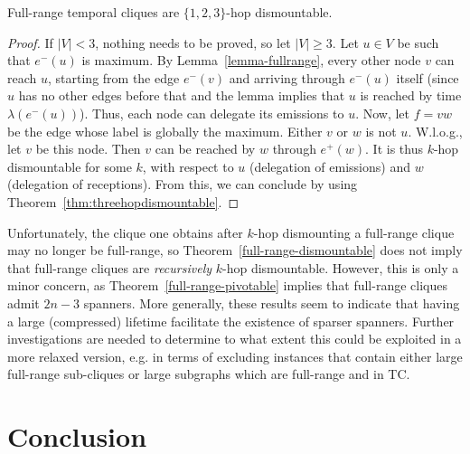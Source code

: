 \documentclass[USenglish, a4paper, thm-restate,numberwithinsect, cleveref]{lipics-v2021}
\begin{document}
\begin{theorem}
  \label{full-range-dismountable}
  Full-range temporal cliques are $\{1,2,3\}$-hop dismountable.
\end{theorem}
\begin{proof}
  If $|V|<3$, nothing needs to be proved, so let $|V|\ge 3$.
  Let $u\in V$ be such that $e^-(u)$ is maximum. By Lemma~\ref{lemma-fullrange}, every other node $v$ can reach $u$,
  starting from the edge $e^-(v)$ and arriving through $e^-(u)$ itself (since $u$ has no other edges before that and the lemma implies that $u$ is reached by time $\lambda(e^-(u))$).
  Thus, each node can delegate its emissions to $u$. Now, let $f=vw$ be the edge whose label is globally the maximum. Either $v$ or $w$ is not $u$. W.l.o.g., let $v$ be this node.
  Then $v$ can be reached by $w$ through $e^+(w)$. It is thus $k$-hop dismountable for some $k$, with respect to $u$ (delegation of emissions) and $w$ (delegation of receptions).
  From this, we can conclude by using Theorem~\ref{thm:threehopdismountable}.
\end{proof}

Unfortunately, the clique one obtains after $k$-hop dismounting a full-range clique may no longer be full-range, so Theorem~\ref{full-range-dismountable} does not imply that full-range cliques are \emph{recursively} $k$-hop dismountable. However, this is only a minor concern, as Theorem~\ref{full-range-pivotable} implies that full-range cliques admit $2n-3$ spanners. More generally, these results seem to indicate that having a large (compressed) lifetime facilitate the existence of sparser spanners. Further investigations are needed to determine to what extent this could be exploited in a more relaxed version, e.g. in terms of excluding instances that contain either large full-range sub-cliques or large subgraphs which are full-range and in \textsf{TC}.



\section{Conclusion}
\label{sec:conclusion}
\end{document}
